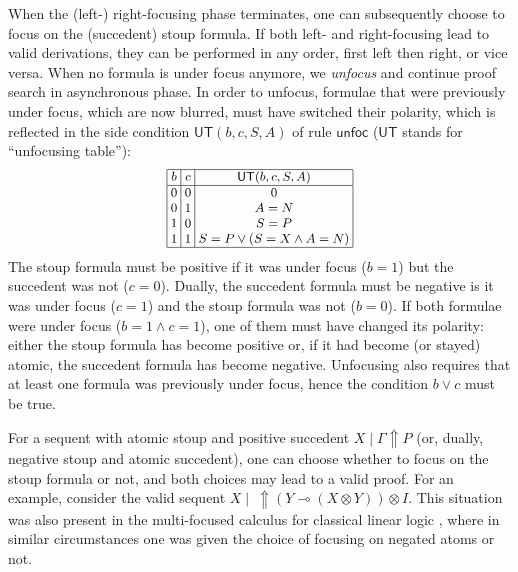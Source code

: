 \documentclass[runningheads]{llncs}
\newcommand{\ot}{\otimes}
\newcommand{\lolli}{\multimap}
\newcommand{\I}{\mathsf{I}}
\newcommand{\UT}{\mathsf{UT}}
\newcommand{\up}{\Uparrow}
\newcommand{\unfoc}{\mathsf{unfoc}}
\begin{document}
When the (left-) right-focusing phase terminates, one can subsequently choose to focus on the (succedent) stoup formula. If both left- and right-focusing lead to valid derivations, they can be performed in any order, first left then right, or vice versa. When no formula is under focus anymore, we \emph{unfocus} and continue proof search in asynchronous phase. In order to unfocus, formulae that were previously under focus, which are now blurred, must have switched their polarity, which is reflected in the side condition $\UT(b,c,S,A)$ of rule $\unfoc$ ($\UT$ stands for ``unfocusing table''):
\[\small
\begin{array}{|@{\;}c@{\;}|@{\;}c@{\;}|@{\;}c@{\;}|}
  \hline
b & c & \UT(b,c,S,A) \\
\hline
0 & 0 & 0 \\
0 & 1 & A = N \\
1 & 0 & S = P \\
1 & 1 & S = P \vee (S = X \wedge A = N)\\
  \hline
\end{array}
\]
The stoup formula must be positive if it was under focus ($b=1$) but the succedent was not ($c=0$). Dually, the succedent formula must be negative is it was under focus ($c = 1$) and the stoup formula was not ($b = 0$). If both formulae were under focus ($b = 1 \wedge c = 1$), one of them must have changed its polarity: either the stoup formula has become positive or, if it had become (or stayed)  atomic, the succedent formula has become negative. Unfocusing also requires that at least one formula was previously under focus, hence the condition $b \vee c$ must be true.

For a sequent with atomic stoup and positive succedent $X \mid \Gamma \up P$ (or, dually, negative stoup and atomic succedent), one can choose whether to focus on the stoup formula or not, and both choices may lead to a valid proof. For an example, consider the valid sequent $X \mid ~ \up (Y \lolli (X \ot Y)) \ot I$. This situation was also present in the multi-focused calculus for classical linear logic \cite{chaudhuri:canonical:2008}, where in similar circumstances one was given the choice of focusing on negated atoms or not.
\end{document}
